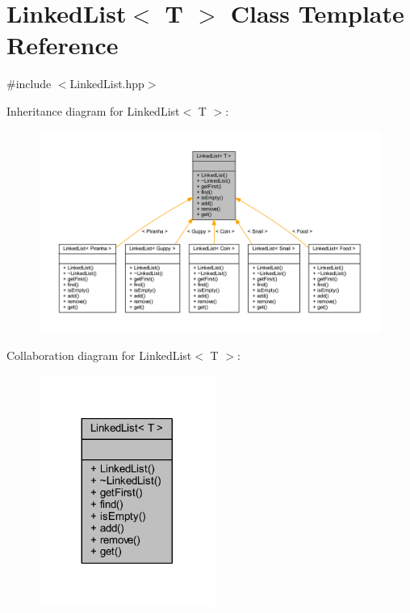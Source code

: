 \hypertarget{class_linked_list}{}\section{Linked\+List$<$ T $>$ Class Template Reference}
\label{class_linked_list}


{\ttfamily \#include $<$Linked\+List.\+hpp$>$}



Inheritance diagram for Linked\+List$<$ T $>$\+:\nopagebreak
\begin{figure}[H]
\begin{center}
\leavevmode
\includegraphics[width=350pt]{class_linked_list__inherit__graph}
\end{center}
\end{figure}


Collaboration diagram for Linked\+List$<$ T $>$\+:\nopagebreak
\begin{figure}[H]
\begin{center}
\leavevmode
\includegraphics[width=164pt]{class_linked_list__coll__graph}
\end{center}
\end{figure}
